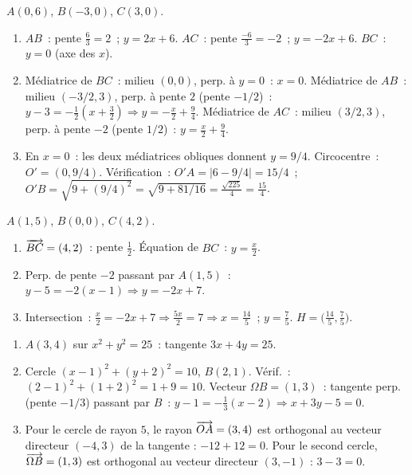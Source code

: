 $A(0,6)$, $B(-3,0)$, $C(3,0)$.
\begin{enumerate}
  \item $AB$~: pente $\frac{6}{3}=2$~; $y=2x+6$.
        $AC$~: pente $\frac{-6}{3}=-2$~; $y=-2x+6$.
        $BC$~: $y=0$ (axe des $x$).
  \item M\'ediatrice de $BC$~: milieu $(0,0)$, perp. \`a $y=0$~: $x=0$.
        M\'ediatrice de $AB$~: milieu $(-3/2,3)$, perp. \`a pente $2$ (pente $-1/2$)~:
        $y-3=-\frac{1}{2}(x+\frac{3}{2})\Rightarrow y=-\frac{x}{2}+\frac{9}{4}$.
        M\'ediatrice de $AC$~: milieu $(3/2,3)$, perp. \`a pente $-2$ (pente $1/2$)~:
        $y=\frac{x}{2}+\frac{9}{4}$.
  \item En $x=0$~: les deux m\'ediatrices obliques donnent $y=9/4$.
        Circocentre~: $O'=(0,9/4)$. V\'erification~:
        $O'A=|6-9/4|=15/4$~; $O'B=\sqrt{9+(9/4)^2}=\sqrt{9+81/16}=\frac{\sqrt{225}}{4}=\frac{15}{4}$.\checkmark
\end{enumerate}


$A(1,5)$, $B(0,0)$, $C(4,2)$.
\begin{enumerate}
  \item $\overrightarrow{BC}=(4,2)$~: pente $\frac{1}{2}$. \'Equation de $BC$~: $y=\frac{x}{2}$.
  \item Perp. de pente $-2$ passant par $A(1,5)$~: $y-5=-2(x-1)\Rightarrow y=-2x+7$.
  \item Intersection~: $\frac{x}{2}=-2x+7\Rightarrow\frac{5x}{2}=7\Rightarrow x=\frac{14}{5}$~;
        $y=\frac{7}{5}$. $H=\bigl(\frac{14}{5},\frac{7}{5}\bigr)$.
\end{enumerate}


\begin{enumerate}
  \item $A(3,4)$ sur $x^2+y^2=25$~: tangente $3x+4y=25$.
  \item Cercle $(x-1)^2+(y+2)^2=10$, $B(2,1)$.
        V\'erif.~: $(2-1)^2+(1+2)^2=1+9=10$.\checkmark
        Vecteur $\Omega B=(1,3)$~: tangente perp. (pente $-1/3$) passant par $B$~:
        $y-1=-\frac{1}{3}(x-2)\Rightarrow x+3y-5=0$.
  \item Pour le cercle de rayon $5$, le rayon $\overrightarrow{OA}=(3,4)$ est orthogonal
        au vecteur directeur $(-4,3)$ de la tangente : $-12+12=0$.
        Pour le second cercle, $\overrightarrow{\Omega B}=(1,3)$ est orthogonal
        au vecteur directeur $(3,-1)$ : $3-3=0$.
\end{enumerate}

